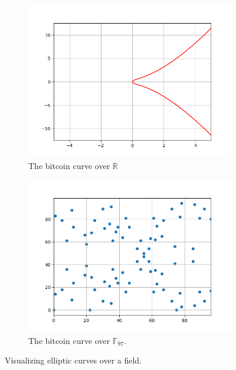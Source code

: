 \documentclass{article}
\begin{document}
    \begin{figure}[htbp]
        \centering
        
        \begin{subfigure}[t]{.45\textwidth}
            \centering
            \includegraphics[scale = 0.4]{images/curve.png}
            \caption{The bitcoin curve over $\mathbb{R}$}
            \label{fig:bitcoin_field_real}
        \end{subfigure}
        \begin{subfigure}[t]{.45\textwidth}
            \centering
            \includegraphics[scale = 0.4]{images/curve_over_field.png}
            \caption{The bitcoin curve over $\mathbb{F}_{97}$.}
            \label{fig:bitcoin_curve_field}
        \end{subfigure}
        \caption{Visualizing elliptic curves over a field.}
        \label{fig:bitcoin_curve}
    \end{figure}
\end{document}
